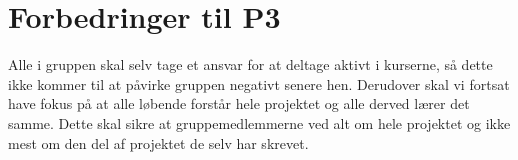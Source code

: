 \section{Forbedringer til P3}
Alle i gruppen skal selv tage et ansvar for at deltage aktivt i kurserne, så dette ikke kommer til at påvirke gruppen negativt senere hen. Derudover skal vi fortsat have fokus på at alle løbende forstår hele projektet og alle derved lærer det samme. Dette skal sikre at gruppemedlemmerne ved alt om hele projektet og ikke mest om den del af projektet de selv har skrevet. 
